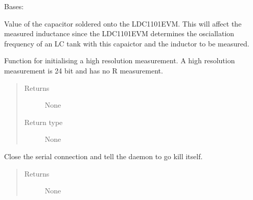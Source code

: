 \documentclass[letterpaper,10pt,english]{sphinxmanual}
\begin{document}
\begin{fulllineitems}
\label{\detokenize{index:ldc1101evm.ldc1101evm}}
\sphinxAtStartPar
Bases: 

\begin{fulllineitems}
\label{\detokenize{index:ldc1101evm.ldc1101evm.Csensor}}
\sphinxAtStartPar
Value of the capacitor soldered onto the LDC1101EVM. This will affect the measured inductance since the LDC1101EVM determines the osciallation frequency of an LC tank with this capaictor and the inductor to be measured.

\end{fulllineitems}


\begin{fulllineitems}
\label{\detokenize{index:ldc1101evm.ldc1101evm.LHR_init}}
\sphinxAtStartPar
Function for initialising a high resolution measurement. A high resolution measurement is 24 bit and has no R measurement.
\begin{quote}\begin{description}
\item[{Returns}] \leavevmode
\sphinxAtStartPar
None

\item[{Return type}] \leavevmode
\sphinxAtStartPar
None

\end{description}\end{quote}

\end{fulllineitems}


\begin{fulllineitems}
\label{\detokenize{index:ldc1101evm.ldc1101evm.close}}
\sphinxAtStartPar
Close the serial connection and tell the daemon to go kill itself.
\begin{quote}\begin{description}
\item[{Returns}] \leavevmode
\sphinxAtStartPar
None


\end{description}
\end{quote}
\end{fulllineitems}
\end{fulllineitems}
\end{document}
